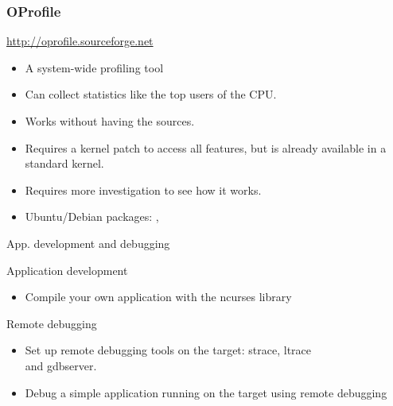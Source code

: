 \begin{frame}
  \frametitle{OProfile}
  \url{http://oprofile.sourceforge.net}
  \begin{itemize}
  \item A system-wide profiling tool
  \item Can collect statistics like the top users of the CPU.
  \item Works without having the sources.
  \item Requires a kernel patch to access all features, but is already
    available in a standard kernel.
  \item Requires more investigation to see how it works.
  \item Ubuntu/Debian packages: , 
  \end{itemize}
\end{frame}

\setuplabframe
{App. development and debugging}
{
  Application development
  \begin{itemize}
  \item Compile your own application with the ncurses library
  \end{itemize}
  Remote debugging
  \begin{itemize}
  \item Set up remote debugging tools on the target: strace, ltrace\\
    and gdbserver.
  \item Debug a simple application running on the target using remote
    debugging
  \end{itemize}
}

